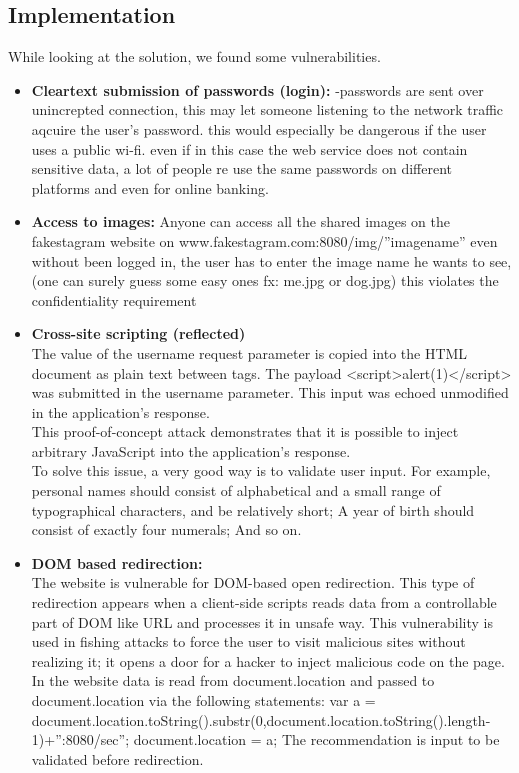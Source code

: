 \subsection{Implementation}

While looking at the solution, we found some vulnerabilities. \\

\begin{itemize}  
\item \textbf{Cleartext submission of passwords (login):}
-passwords are sent over unincrepted connection, this may let someone listening to the network traffic aqcuire the user's password.
this would especially be dangerous if the user uses a public wi-fi.
even if in this case the web service does not contain sensitive data, a lot of people re use the same passwords on different platforms and even for online banking.

\item \textbf{Access to images:}
Anyone can access all the shared images on the fakestagram website on www.fakestagram.com:8080/img/''imagename'' even without been logged in, the user has to enter the image name he wants to see,(one can surely guess some easy ones fx: me.jpg or dog.jpg)
this violates the confidentiality requirement


\item \textbf{Cross-site scripting (reflected)} \\
The value of the username request parameter is copied into the HTML document as plain text between tags. The payload <script>alert(1)</script> was submitted in the username parameter. This input was echoed unmodified in the application's response. \\

This proof-of-concept attack demonstrates that it is possible to inject arbitrary JavaScript into the application's response. \\

To solve this issue, a very good way is to validate user input. For example, personal names should consist of alphabetical and a small range of typographical characters, and be relatively short; A year of birth should consist of exactly four numerals; And so on.

\item \textbf{DOM based redirection:}\\
The website is vulnerable for DOM-based open redirection. This type of redirection appears when a client-side scripts reads data from a controllable part of DOM like URL and processes it in unsafe way. This vulnerability is used in fishing attacks to force the user to visit malicious sites without realizing it; it opens a door for a hacker to inject malicious code on the page. In the website data is read from document.location and passed to document.location via the following statements: var a = document.location.toString().substr(0,document.location.toString().length-
1)+”:8080/sec”; document.location = a;
The recommendation is input to be validated before redirection.


\end{itemize}
